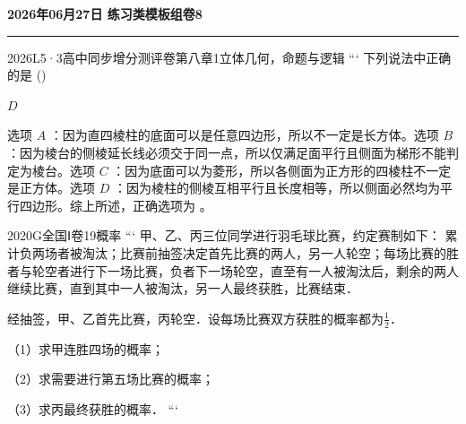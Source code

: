 \documentclass[12pt,UTF-8,a4paper]{ctexart}
\newcommand{\mytitle}{}
\numberwithin{figure}{section}
\theoremstyle{mystyle}
\theoremstyle{mystylekaishu}
\theoremstyle{mystyle}
\numberwithin{xiti}{section}
\begin{document}
\thispagestyle{plain} %
\renewcommand{\mytitle}{2026年06月27日 练习类模板组卷8}

\begin{center}
  {\Huge\bfseries\color{structure} \mytitle}
  \vspace{0.5em}
  
  \textcolor{structure}{\rule{\linewidth}{1.5pt}}
\end{center}
\vspace{1em}


\begin{problem}{2026}{L}{5·3高中同步增分测评卷第八章}{1}{立体几何，命题与逻辑}
```
下列说法中正确的是 (\hspace{1cm})
\begin{choices}
\end{choices}
\end{problem}

\begin{answer}
$D$
\end{answer}

\begin{solutions}
选项 $A$ ：因为直四棱柱的底面可以是任意四边形，所以不一定是长方体。选项 $B$ ：因为棱台的侧棱延长线必须交于同一点，所以仅满足面平行且侧面为梯形不能判定为棱台。选项 $C$ ：因为底面可以为菱形，所以各侧面为正方形的四棱柱不一定是正方体。选项 $D$ ：因为棱柱的侧棱互相平行且长度相等，所以侧面必然均为平行四边形。综上所述，正确选项为 。
\end{solutions}


\begin{problem}{2020}{G}{全国Ⅰ卷}{19}{概率}
```
甲、乙、丙三位同学进行羽毛球比赛，约定赛制如下：  
累计负两场者被淘汰；比赛前抽签决定首先比赛的两人，另一人轮空；每场比赛的胜者与轮空者进行下一场比赛，负者下一场轮空，直至有一人被淘汰后，剩余的两人继续比赛，直到其中一人被淘汰，另一人最终获胜，比赛结束．  

经抽签，甲、乙首先比赛，丙轮空．设每场比赛双方获胜的概率都为$\frac{1}{2}$．  

（1）求甲连胜四场的概率；  

（2）求需要进行第五场比赛的概率；  

（3）求丙最终获胜的概率．
```
\end{problem}
\end{document}
